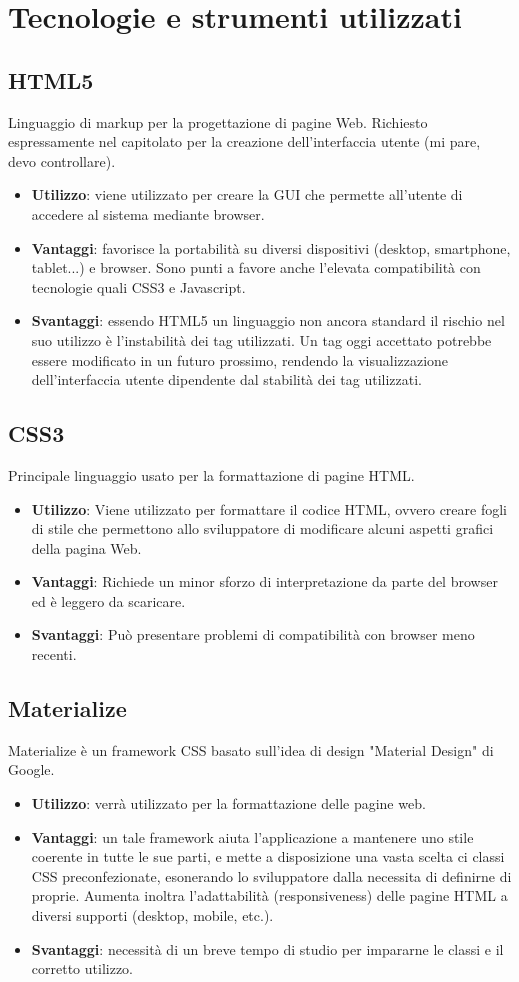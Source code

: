 \rigaregistro{0.0.17}{Luca Alessio (Progettista)}{12/05/2016}{Termine stesura sezione diagrammi e revisione/ampliamento di vari paragrafi}\documentclass[a4paper,11pt]{article}
\begin{document}
	\section{Tecnologie e strumenti utilizzati}
	\subsection{HTML5}
	Linguaggio di markup per la progettazione di pagine Web. Richiesto espressamente nel capitolato per la creazione dell'interfaccia utente (mi pare, devo controllare).
	\begin{itemize}
		\item\textbf{Utilizzo}: viene utilizzato per creare la GUI che permette all'utente di accedere al sistema mediante browser.
		\item\textbf{Vantaggi}: favorisce la portabilità su diversi dispositivi (desktop, smartphone, tablet...) e browser.
Sono punti a favore anche l'elevata compatibilità con tecnologie quali CSS3 e Javascript.
		\item\textbf{Svantaggi}: essendo HTML5 un linguaggio non ancora standard il rischio nel suo utilizzo è l'instabilità dei tag utilizzati. Un tag oggi accettato potrebbe essere modificato in un futuro prossimo, rendendo la visualizzazione dell'interfaccia utente dipendente dal stabilità dei tag utilizzati. 
	\end{itemize}
	\subsection{CSS3}
	Principale linguaggio usato per la formattazione di pagine HTML.
	\begin{itemize}
		\item\textbf{Utilizzo}: Viene utilizzato per formattare il codice HTML,
ovvero creare fogli di stile che permettono allo sviluppatore di modificare alcuni aspetti grafici della pagina Web.
		\item\textbf{Vantaggi}: Richiede un minor sforzo di interpretazione da parte del browser ed è leggero da scaricare.
		\item\textbf{Svantaggi}: Può presentare problemi di compatibilità con browser meno recenti.
	\end{itemize}
	\subsection{Materialize}
	Materialize è un framework CSS basato sull'idea di design "Material Design" di Google.
	\begin{itemize}
		\item\textbf{Utilizzo}: verrà utilizzato per la formattazione delle pagine web.
		\item\textbf{Vantaggi}: un tale framework aiuta l'applicazione a mantenere uno stile coerente in tutte le sue parti, e mette a disposizione una vasta scelta ci classi CSS preconfezionate, esonerando lo sviluppatore dalla necessita di definirne di proprie. Aumenta inoltra l'adattabilità (responsiveness) delle pagine HTML a diversi supporti (desktop, mobile, etc.).
		\item\textbf{Svantaggi}: necessità di un breve tempo di studio per impararne le classi e il corretto utilizzo.
	\end{itemize}
\end{document}
